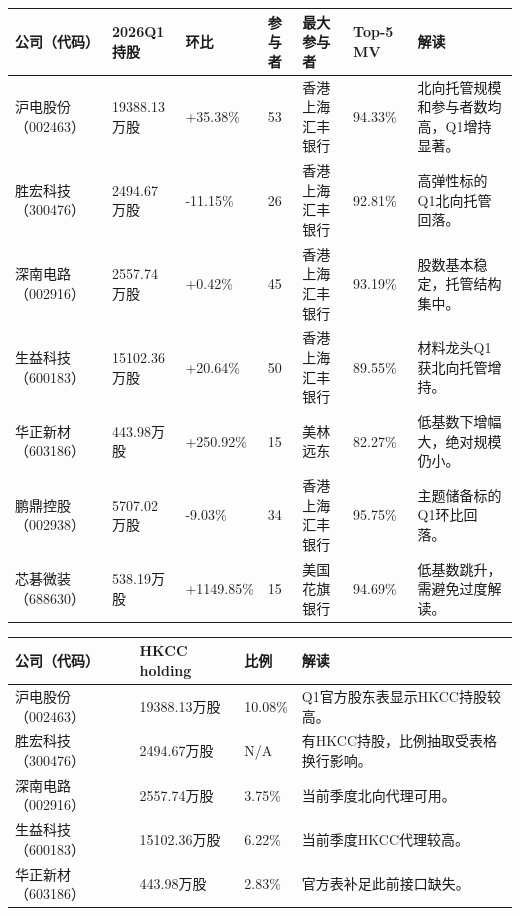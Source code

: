 \begin{exhibitbox}
\footnotesize
\begin{tabularx}{\textwidth}{L{1.6cm}R{1.9cm}R{1.5cm}R{1.4cm}L{2.6cm}R{1.8cm}X}
\toprule
\textbf{公司（代码）} & \textbf{2026Q1持股} & \textbf{环比} & \textbf{参与者} & \textbf{最大参与者} & \textbf{Top-5 MV} & \textbf{解读} \\
\midrule
沪电股份（002463） & 19388.13万股 & +35.38\% & 53 & 香港上海汇丰银行 & 94.33\% & 北向托管规模和参与者数均高，Q1增持显著。 \\
胜宏科技（300476） & 2494.67万股 & -11.15\% & 26 & 香港上海汇丰银行 & 92.81\% & 高弹性标的Q1北向托管回落。 \\
深南电路（002916） & 2557.74万股 & +0.42\% & 45 & 香港上海汇丰银行 & 93.19\% & 股数基本稳定，托管结构集中。 \\
生益科技（600183） & 15102.36万股 & +20.64\% & 50 & 香港上海汇丰银行 & 89.55\% & 材料龙头Q1获北向托管增持。 \\
华正新材（603186） & 443.98万股 & +250.92\% & 15 & 美林远东 & 82.27\% & 低基数下增幅大，绝对规模仍小。 \\
鹏鼎控股（002938） & 5707.02万股 & -9.03\% & 34 & 香港上海汇丰银行 & 95.75\% & 主题储备标的Q1环比回落。 \\
芯碁微装（688630） & 538.19万股 & +1149.85\% & 15 & 美国花旗银行 & 94.69\% & 低基数跳升，需避免过度解读。 \\
\bottomrule
\end{tabularx}
\end{exhibitbox}

\begin{exhibitbox}
\footnotesize
\begin{tabularx}{\textwidth}{L{1.8cm}R{2.0cm}R{1.6cm}X}
\toprule
\textbf{公司（代码）} & \textbf{HKCC holding} & \textbf{比例} & \textbf{解读} \\
\midrule
沪电股份（002463） & 19388.13万股 & 10.08\% & Q1官方股东表显示HKCC持股较高。 \\
胜宏科技（300476） & 2494.67万股 & N/A & 有HKCC持股，比例抽取受表格换行影响。 \\
深南电路（002916） & 2557.74万股 & 3.75\% & 当前季度北向代理可用。 \\
生益科技（600183） & 15102.36万股 & 6.22\% & 当前季度HKCC代理较高。 \\
华正新材（603186） & 443.98万股 & 2.83\% & 官方表补足此前接口缺失。 \\
\bottomrule
\end{tabularx}
\end{exhibitbox}

